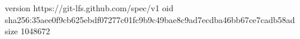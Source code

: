 version https://git-lfs.github.com/spec/v1
oid sha256:35aee0f9cb625ebdf07277c01fc9b9c49bae8c9ad7ecdba46bb67ce7cadb58ad
size 1048672
